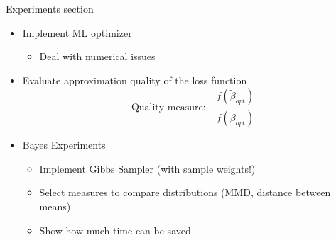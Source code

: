 \documentclass[gray]{beamer}
\begin{document}
\begin{frame}{Experiments section}
    \begin{itemize}
        \item Implement ML optimizer
              \begin{itemize}
                  \item Deal with numerical issues
              \end{itemize}
        \item Evaluate approximation quality of the loss function
              \begin{equation*}
                  \text{Quality measure:}\quad \frac{f(\tilde\beta_{opt})}{f(\beta_{opt})}
              \end{equation*}
        \item Bayes Experiments
              \begin{itemize}
                  \item Implement Gibbs Sampler (with sample weights!)
                  \item Select measures to compare distributions (MMD, distance between means)
                  \item Show how much time can be saved
              \end{itemize}
    \end{itemize}
\end{frame}
\end{document}
